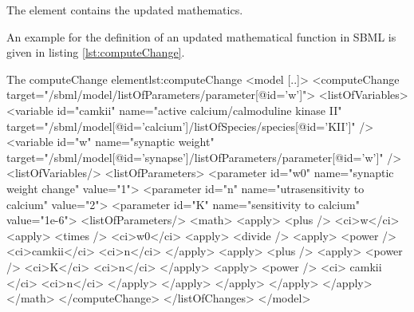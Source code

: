 The  element contains the updated mathematics. 

An example for the definition of an updated mathematical function in SBML is given in listing \ref{lst:computeChange}.
%
\begin{myXmlLst}{The computeChange element}{lst:computeChange}
<model [..]>
    <computeChange target="/sbml/model/listOfParameters/parameter[@id='w']">
      <listOfVariables>
        <variable id="camkii" name="active calcium/calmoduline kinase II" 
                  target="/sbml/model[@id='calcium']/listOfSpecies/species[@id='KII']" />
        <variable id="w" name="synaptic weight"
                  target="/sbml/model[@id='synapse']/listOfParameters/parameter[@id='w']" />
      <listOfVariables/>
      <listOfParameters>
        <parameter id="w0" name="synaptic weight change" value="1">
        <parameter id="n" name="utrasensitivity to calcium" value="2">
        <parameter id="K" name="sensitivity to calcium" value="1e-6">
      <listOfParameters/>
      <math>
         <apply>
           <plus />
           <ci>w</ci>
           <apply>
             <times />
             <ci>w0</ci>
             <apply>
               <divide />
               <apply>
                 <power />
                 <ci>camkii</ci>
                 <ci>n</ci>
               </apply>
               <apply>
                 <plus />
                 <apply>
                   <power />
                   <ci>K</ci>
                   <ci>n</ci>
                 </apply>
                 <apply>
                   <power />
                   <ci> camkii </ci>
                   <ci>n</ci>
                 </apply>
               </apply>
             </apply>
           </apply> 
         </apply>
      </math>
    </computeChange>
  </listOfChanges>
</model>
\end{myXmlLst}
%

